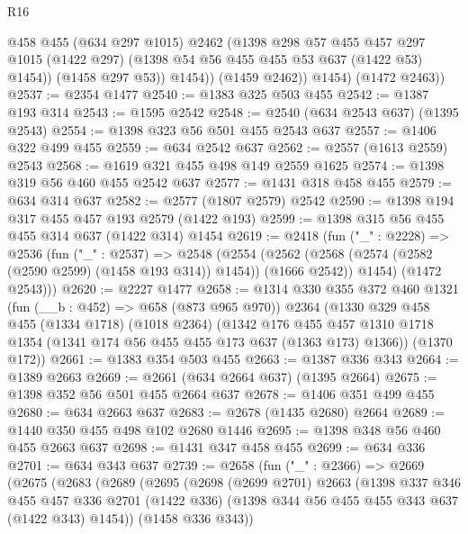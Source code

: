 \begin{lexlean}{R16}
\begin{coremodule}
                @458
                @455
                (@634 @297 @1015)
                @2462
                (@1398
                  @298
                  @57
                  @455
                  @457
                  @297
                  @1015
                  (@1422 @297)
                  (@1398 @54 @56 @455 @455 @53 @637 (@1422 @53) @1454))
                (@1458 @297 @53))
              @1454))
          (@1459 @2462))
        @1454)
      (@1472 @2463))
@2537 := @2354 @1477
@2540 := @1383 @325 @503 @455
@2542 := @1387 @193 @314
@2543 := @1595 @2542
@2548 := @2540 (@634 @2543 @637) (@1395 @2543)
@2554 := @1398 @323 @56 @501 @455 @2543 @637
@2557 := @1406 @322 @499 @455
@2559 := @634 @2542 @637
@2562 := @2557 (@1613 @2559) @2543
@2568 := @1619 @321 @455 @498 @149 @2559 @1625
@2574 := @1398 @319 @56 @460 @455 @2542 @637
@2577 := @1431 @318 @458 @455
@2579 := @634 @314 @637
@2582 := @2577 (@1807 @2579) @2542
@2590 := @1398 @194 @317 @455 @457 @193 @2579 (@1422 @193)
@2599 := @1398 @315 @56 @455 @455 @314 @637 (@1422 @314) @1454
@2619 := @2418
    (fun ("_" : @2228) =>
    @2536
      (fun ("_" : @2537) =>
      @2548
        (@2554
          (@2562 (@2568 (@2574 (@2582 (@2590 @2599) (@1458 @193 @314)) @1454)) (@1666 @2542))
          @1454)
        (@1472 @2543)))
@2620 := @2227 @1477
@2658 := @1314
    @330
    @355
    @372
    @460
    @1321
    (fun (__b : @452) => @658 (@873 @965 @970))
    @2364
    (@1330
      @329
      @458
      @455
      (@1334 @1718)
      (@1018 @2364)
      (@1342
        @176
        @455
        @457
        @1310
        @1718
        @1354
        (@1341 @174 @56 @455 @455 @173 @637 (@1363 @173) @1366))
      (@1370 @172))
@2661 := @1383 @354 @503 @455
@2663 := @1387 @336 @343
@2664 := @1389 @2663
@2669 := @2661 (@634 @2664 @637) (@1395 @2664)
@2675 := @1398 @352 @56 @501 @455 @2664 @637
@2678 := @1406 @351 @499 @455
@2680 := @634 @2663 @637
@2683 := @2678 (@1435 @2680) @2664
@2689 := @1440 @350 @455 @498 @102 @2680 @1446
@2695 := @1398 @348 @56 @460 @455 @2663 @637
@2698 := @1431 @347 @458 @455
@2699 := @634 @336
@2701 := @634 @343 @637
@2739 := @2658
    (fun ("_" : @2366) =>
    @2669
      (@2675
        (@2683
          (@2689
            (@2695
              (@2698
                (@2699 @2701)
                @2663
                (@1398
                  @337
                  @346
                  @455
                  @457
                  @336
                  @2701
                  (@1422 @336)
                  (@1398 @344 @56 @455 @455 @343 @637 (@1422 @343) @1454))
                (@1458 @336 @343))

\end{coremodule}
\end{lexlean}
